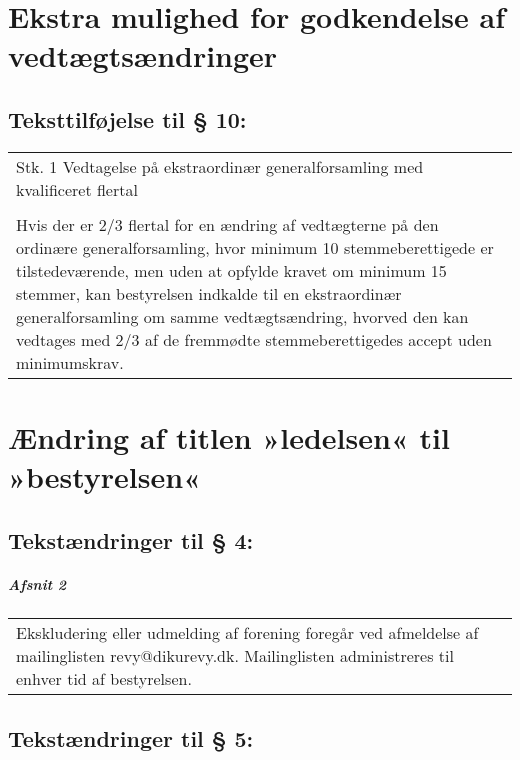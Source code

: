 \documentclass[a4paper,11pt]{report}
\newenvironment{quotationb}%
{\begin{tabular}{|p{10cm}}}%
{\\\end{tabular}}
\begin{document}
\begin{appendices}

\chapter{Ekstra mulighed for godkendelse af vedtægtsændringer}
\label{app:change1}

\section*{Teksttilføjelse til § 10:}

\begin{quotationb}
Stk. 1 Vedtagelse på ekstraordinær generalforsamling med kvalificeret flertal\\
\\
Hvis der er 2/3 flertal for en ændring af vedtægterne på den ordinære
generalforsamling, hvor minimum 10 stemmeberettigede er tilstedeværende, men
uden at opfylde kravet om minimum 15 stemmer, kan bestyrelsen indkalde til en
ekstraordinær generalforsamling om samme vedtægtsændring, hvorved den kan 
vedtages med 2/3 af de fremmødte stemmeberettigedes accept uden minimumskrav.
\end{quotationb}

\chapter{Ændring af titlen »ledelsen« til »bestyrelsen«}
\label{app:change2}

\section*{Tekstændringer til § 4:}

\paragraph{Afsnit 2}

\begin{quotationb}
Ekskludering eller udmelding af forening foregår ved afmeldelse af mailinglisten
revy@dikurevy.dk.  Mailinglisten administreres til enhver tid af bestyrelsen.
\end{quotationb}

\section*{Tekstændringer til § 5:}


\end{appendices}
\end{document}
